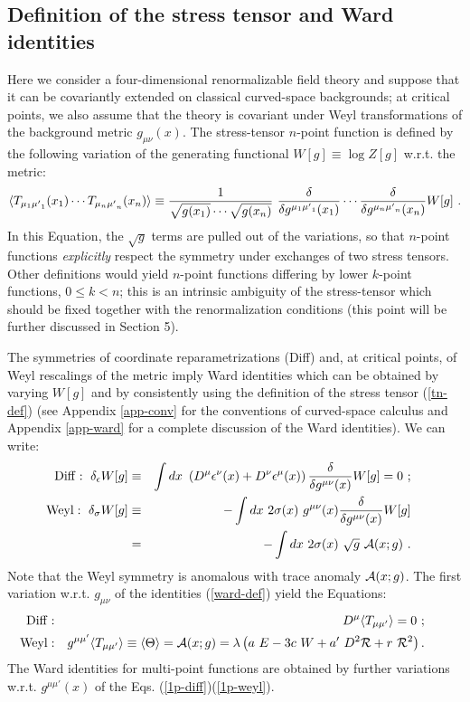 \documentclass[11pt]{article}
\newcommand{\beq}{\begin{equation}}
\newcommand{\eeq}{\end{equation}}
\newcommand{\bea}{\begin{eqnarray}}
\newcommand{\eea}{\end{eqnarray}}
\def\s{\sigma}
\def\d{\delta}
\def\eps{\epsilon}
\def\l{\lambda}
\def\nl{\nonumber\\}
\def\bh{\!\!\!\!\!\!}
\def\bra{\langle}
\def\ket{\rangle}
\def\mup{{\mu'}}    %
\def\A{{\cal A}}    %
\begin{document}
\subsection{Definition of the stress tensor and Ward identities} 

Here we consider a four-dimensional
renormalizable field theory and suppose that it
can be covariantly extended on classical curved-space backgrounds;
at critical points, we also assume that the theory is covariant under 
Weyl transformations of the background metric  $g_{\mu\nu}(x)$.
 The stress-tensor $n$-point function is defined by the following 
variation of the generating functional $W[g]\equiv\log Z[g]$ 
w.r.t. the metric: 
\beq\label{tn-def} 
\bra T_{\mu_1 \mup_1}(x_1) \cdots T_{\mu_n \mup_n} (x_n)\ket \equiv  
{1 \over \sqrt{g(x_1)}\cdots \sqrt{g(x_n)}}  
\ {\delta\over \delta g^{\mu_1 \mup_1}(x_1)} \cdots 
{\delta\over \delta g^{\mu_n \mup_n}(x_n)} W[g] \ . 
\eeq 
In this Equation, the $\sqrt{g}$ terms are pulled out of 
the variations, so that $n$-point functions {\it explicitly} respect  
the symmetry under exchanges of two stress tensors. 
Other definitions would yield $n$-point functions differing 
by lower $k$-point functions, $0\le k <n$; this is an intrinsic 
ambiguity of the stress-tensor which should be fixed together with
the renormalization conditions
(this point will be further discussed in Section 5). 

The symmetries of coordinate reparametrizations
(Diff) and, at critical points, of Weyl rescalings of the metric 
imply Ward identities which can be obtained by varying $W[g]$ and by
consistently using the definition of the stress tensor (\ref{tn-def})
(see Appendix \ref{app-conv} for the conventions of curved-space calculus 
and Appendix \ref{app-ward} for a complete discussion of the Ward identities).
We can write:
\bea\label{ward-def}
\bh {\rm Diff}:\  \d_\eps W[g] &\equiv& 
\int dx\ \left(D^{\mu} \eps^{\nu}(x)+ D^{\nu} \eps^{\mu}(x) \right)
{\d \over \d g^{\mu\nu}(x)} W[g]=0 \ ; \nl 
\bh {\rm Weyl}:\ \d_\s W[g] &\equiv& 
- \int dx\ 2 \s (x)\ g^{\mu\nu}(x) {\d \over \d g^{\mu\nu}(x)} W[g] \nl
&=&- \int dx\ 2 \s(x)\ \sqrt{g}\ {\cal A}(x;g)  \ . 
\eea 
Note that the Weyl symmetry is anomalous with trace anomaly ${\cal A}(x;g)$.
The first variation w.r.t. $g_{\mu\nu}$ of the identities
(\ref{ward-def}) yield the Equations: 
\bea 
\bh\bh {\rm Diff}: &&  D^{\mu} \bra T_{\mu \mup}\ket = 0\ ; \label{1p-diff}\\ 
\bh\bh {\rm Weyl}: &&  g^{\mu \mup}\bra T_{\mu \mup}\ket \equiv  
\bra \Theta\ket = \A(x;g) =\l\left(  
a\ E -3c\ W +a'\ D^2 {\cal R}+ r\ {\cal R}^2 \right).
\label{1p-weyl} 
\eea 
The Ward identities for multi-point functions  
are obtained by further variations w.r.t. $g^{\mu\mup}(x)$ 
of the Eqs. (\ref{1p-diff})(\ref{1p-weyl}).
\end{document}
